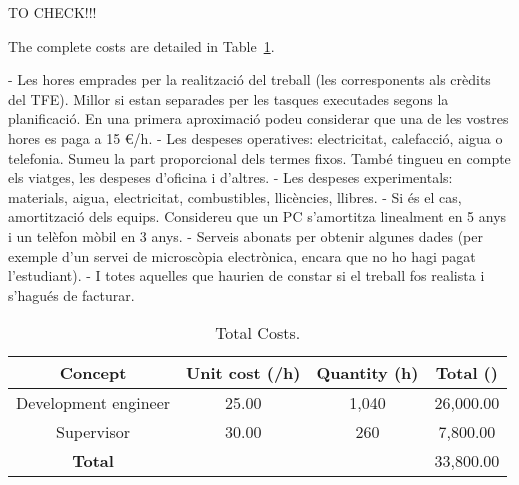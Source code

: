 
TO CHECK!!!

The complete costs are detailed in Table~\ref{tab:equip}.

-	Les hores emprades per la realització del treball (les corresponents als crèdits del TFE). Millor 
si estan separades per les tasques executades segons la planificació. En una primera aproximació podeu considerar
 que una de les vostres hores es paga a 15 €/h.
-	Les despeses operatives: electricitat, calefacció, aigua o telefonia. Sumeu la part proporcional dels termes fixos.
 També tingueu en compte els viatges, les despeses d'oficina i d'altres.
-	Les despeses experimentals: materials, aigua, electricitat, combustibles, llicències, llibres.
-	Si és el cas, amortització dels equips. Considereu que un PC s'amortitza linealment en 5 anys i un telèfon mòbil en 3 anys.
-	Serveis abonats per obtenir algunes dades (per exemple d'un servei de microscòpia electrònica, encara que no ho hagi pagat l'estudiant).
-	I totes aquelles que haurien de constar si el treball fos realista i s'hagués de facturar. 


\begin{table}[!htb]\centering
	\caption{Total Costs.}
	\begin{tabular}{ccc|c}
		\hline
		\textbf{Concept} & \textbf{Unit cost (\texteuro/h)} & \textbf{Quantity (h)} & \textbf{Total (\texteuro)} \\
		\hline
		\hline
		Development engineer & 25.00 & 1,040 & 26,000.00 \\ 
		Supervisor & 30.00 & 260 & 7,800.00 \\
		\hline
		\textbf{Total} & & & 33,800.00 \\
		\hline
	\end{tabular}
	\label{tab:equip}
\end{table}


